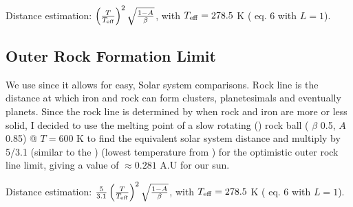 \documentclass[letterpaper,10pt,english]{sphinxmanual}
\begin{document}
\sphinxAtStartPar
Distance estimation: \(\left(\frac{T}{T_{\rm eff}}\right) ^ 2 \sqrt{\frac{1-A}{\beta}}\),
with \(T_{\rm eff} = 278.5\) K ( eq. 6 with \(L = 1\)).


\subsection{Outer Rock Formation Limit}
\label{\detokenize{quantities/children_orbit_limits/outer_rock_formation_limit:outer-rock-formation-limit}}\label{\detokenize{quantities/children_orbit_limits/outer_rock_formation_limit::doc}}\label{\detokenize{quantities/children_orbit_limits/outer_rock_formation_limit:id1}}
\sphinxAtStartPar
We use {\hyperref[\detokenize{quantities/insolation_models/selsis/selsis:selsis-insolation-model}]{}} since it allows for easy, Solar system comparisons.
Rock line is the distance at which iron and rock can form clusters, planetesimals and eventually planets.
Since the rock line is determined by when rock and iron are more or less solid, I decided to use
the melting point of a slow rotating ({\hyperref[\detokenize{quantities/children_orbit_limits/tidal_locking_radius:id1}]{}}) rock ball
({\hyperref[\detokenize{quantities/surface/emission/heat_distribution:id1}]{}} \(\beta\) 0.5, {\hyperref[\detokenize{quantities/surface/emission/albedo:id1}]{}} \(A\) 0.85)
@ \(T = 600\) K to find the equivalent solar system distance
and multiply by 5/3.1 (similar to the {\hyperref[\detokenize{quantities/children_orbit_limits/outer_water_frost_limit:id1}]{}})
(lowest temperature from )
for the optimistic outer rock line limit, giving a value of \(\approx 0.281\) A.U for our sun.

\sphinxAtStartPar
Distance estimation: \(\frac{5}{3.1}\left(\frac{T}{T_{\rm eff}}\right) ^ 2 \sqrt{\frac{1-A}{\beta}}\),
with \(T_{\rm eff} = 278.5\) K ( eq. 6 with \(L = 1\)).
\end{document}
